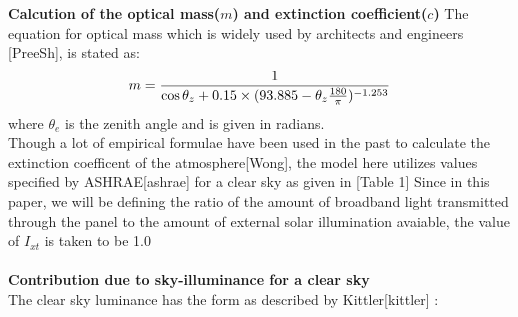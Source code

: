 \documentclass[times, 10pt,a4paper]{article}
\begin{document}
\textbf{Calcution of the optical mass($m$) and extinction coefficient($c$)}
The equation for optical mass which is widely used by architects and engineers [PreeSh], is stated as: 
\begin{equation*}
m = {1 \over \cos \theta_z + 0.15\times(93.885 - \theta_z {180 \over \pi})^{-1.253}}
\end{equation*}
where $\theta_e$ is the zenith angle and is given in radians. \\ 
Though a lot of empirical formulae have been used in the past to calculate the extinction coefficent
of the atmosphere[Wong], the model here utilizes values specified by ASHRAE[ashrae] for a clear sky as given in [Table 1]
Since in this paper, we will be defining the ratio of the amount of broadband light transmitted through the panel 
to the amount of external solar illumination avaiable, the value of $I_{xt}$ is taken to be 1.0\\ \\
\textbf{Contribution due to sky-illuminance for a clear sky} \\ 
The clear sky luminance has the form as described by Kittler[kittler] :
\end{document}
